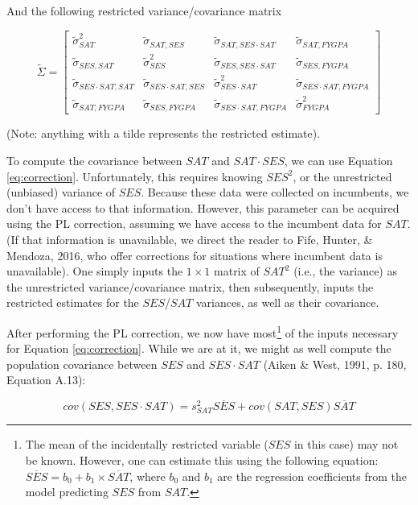 \documentclass[english,man]{apa6}
\theoremstyle{definition}
\theoremstyle{definition}
\theoremstyle{remark}
\begin{document}
And the following restricted variance/covariance matrix

\[
   \widetilde{\Sigma}=
  \left[ {\begin{array}{cccc}
   \tilde{\sigma}^2_{SAT} & \tilde{\sigma}_{SAT,{SES}} & \tilde{\sigma}_{SAT,SES\cdot SAT} & \tilde{\sigma}_{SAT, FYGPA}\\
    \tilde{\sigma}_{SES,SAT} & \tilde{\sigma}^2_{SES} & \tilde{\sigma}_{SES,SES\cdot SAT} & \tilde{\sigma}_{SES, FYGPA} \\
    \tilde{\sigma}_{SES\cdot SAT,SAT} &\tilde{\sigma}_{SES\cdot SAT,SES} & \tilde{\sigma}^2_{SES\cdot SAT} & \tilde{\sigma}_{SES\cdot SAT, FYGPA} \\
     \tilde{\sigma}_{SAT, FYGPA} & \tilde{\sigma}_{SES, FYGPA} & \tilde{\sigma}_{SES\cdot SAT, FYGPA} & \tilde{\sigma}^2_{FYGPA}
  \end{array} } \right]
\]

\noindent (Note: anything with a tilde represents the restricted
estimate).

To compute the covariance between \(SAT\) and \(SAT\cdot SES\), we can
use Equation \ref{eq:correction}. Unfortunately, this requires knowing
\(SES^2\), or the unrestricted (unbiased) variance of \(SES\). Because
these data were collected on incumbents, we don't have access to that
information. However, this parameter can be acquired using the PL
correction, assuming we have access to the incumbent data for \(SAT\).
(If that information is unavailable, we direct the reader to Fife,
Hunter, \& Mendoza, 2016, who offer corrections for situations where
incumbent data is unavailable). One simply inputs the \(1\times1\)
matrix of \(SAT^2\) (i.e., the variance) as the unrestricted
variance/covariance matrix, then subsequently, inputs the restricted
estimates for the \(SES\)/\(SAT\) variances, as well as their
covariance.

After performing the PL correction, we now have most\footnote{The mean
  of the incidentally restricted variable (\(SES\) in this case) may not
  be known. However, one can estimate this using the following equation:
  \(\overline{SES} = b_0 + b_1\times \overline{SAT}\), where \(b_0\) and
  \(b_1\) are the regression coefficients from the model predicting
  \(SES\) from \(SAT\).} of the inputs necessary for Equation
\ref{eq:correction}. While we are at it, we might as well compute the
population covariance between \(SES\) and \(SES \cdot SAT\) (Aiken \&
West, 1991, p. 180, Equation A.13):

\begin{equation}
cov(SES, SES\cdot SAT) = s^2_{SAT} \overline{SES} + cov(SAT, SES) \overline{SAT}
\label{eq:correction2}
\end{equation}
\end{document}
